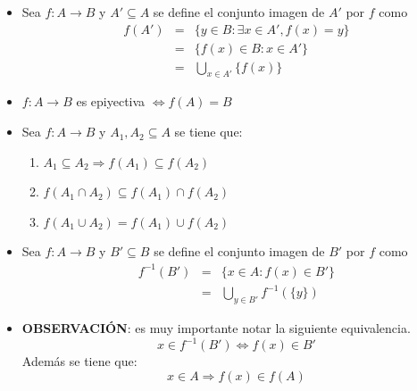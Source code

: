 \documentclass[letterpaper,11pt]{article}
\newcommand{\ssi}{\Longleftrightarrow} %
\theoremstyle{plain}
\begin{document}
\begin{framed}
		\begin{multicols}{2}
		    \begin{itemize}  
                \item Sea $f:A \to B$ y $A'\subseteq A$ se define el conjunto imagen de $A'$ por $f$ como 
                    \begin{align*}
                        f(A')&=& \{y \in B: \exists x \in     A', f(x)=y\} \\
                        &=&\{f(x) \in B: x \in A'\}\\
                        &=& \bigcup_{x \in A'}\{f(x) \}
                    \end{align*}
    
                \item $f:A \to B$ es epiyectiva $\ssi f(A)=B$
    
                \item Sea $f: A \to B$ y $A_{1},A_{2} \subseteq A$            se tiene que:
                    \begin{enumerate}
                        \item $A_{1} \subseteq A_{2} \Rightarrow f(A_{1})\subseteq f(A_{2})$
                        \item $f(A_{1} \cap A_{2}) \subseteq f(A_{1}) \cap f(A_{2})$
                        \item $f(A_{1} \cup A_{2}) = f(A_{1}) \cup f(A_{2})$
                    \end{enumerate}
    
                \item Sea $f:A \to B$ y $B'\subseteq B$ se define el conjunto imagen de $B'$ por $f$ como 
                    \begin{align*}
                        f^{-1}(B')&=&\{x \in A: f(x) \in B'\}\\
                        &=& \bigcup_{y \in B'}f^{-1}(\{y\}) 
                    \end{align*}
    
                \item \textbf{OBSERVACIÓN}: es muy importante notar la siguiente equivalencia.
                $$x \in f^{-1}(B') \ssi f(x) \in B'$$
                Además se tiene que:
                $$x \in A \Longrightarrow f(x)\in f(A)  $$
    

\end{itemize}
\end{multicols}
\end{framed}
\end{document}
